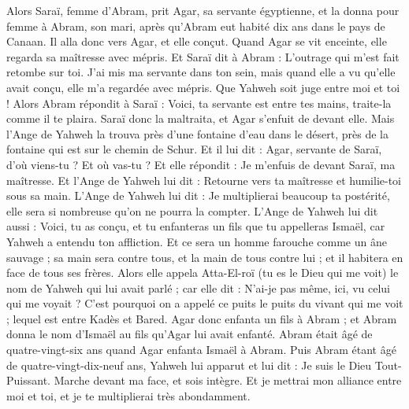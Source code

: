 \begin{multicols}{2}
Alors Saraï, femme d'Abram, prit Agar, sa servante égyptienne, et la donna pour femme à Abram, son mari, après qu'Abram eut habité dix ans dans le pays de Canaan.
Il alla donc vers Agar, et elle conçut. Quand Agar se vit enceinte, elle regarda sa maîtresse avec mépris.
Et Saraï dit à Abram : L'outrage qui m'est fait retombe sur toi. J'ai mis ma servante dans ton sein, mais quand elle a vu qu'elle avait conçu, elle m'a regardée avec mépris. Que Yahweh soit juge entre moi et toi !
Alors Abram répondit à Saraï : Voici, ta servante est entre tes mains, traite-la comme il te plaira. Saraï donc la maltraita, et Agar s'enfuit de devant elle.
Mais l'Ange de Yahweh la trouva près d'une fontaine d'eau dans le désert, près de la fontaine qui est sur le chemin de Schur.
Et il lui dit : Agar, servante de Saraï, d'où viens-tu ? Et où vas-tu ? Et elle répondit : Je m'enfuis de devant Saraï, ma maîtresse.
Et l'Ange de Yahweh lui dit : Retourne vers ta maîtresse et humilie-toi sous sa main.
L'Ange de Yahweh lui dit : Je multiplierai beaucoup ta postérité, elle sera si nombreuse qu'on ne pourra la compter.
L'Ange de Yahweh lui dit aussi : Voici, tu as conçu, et tu enfanteras un fils que tu appelleras Ismaël, car Yahweh a entendu ton affliction.
Et ce sera un homme farouche comme un âne sauvage ; sa main sera contre tous, et la main de tous contre lui ; et il habitera en face de tous ses frères.
Alors elle appela Atta-El-roï (tu es le Dieu qui me voit) le nom de Yahweh qui lui avait parlé ; car elle dit : N'ai-je pas même, ici, vu celui qui me voyait ?
C'est pourquoi on a appelé ce puits le puits du vivant qui me voit ; lequel est entre Kadès et Bared.
Agar donc enfanta un fils à Abram ; et Abram donna le nom d'Ismaël au fils qu'Agar lui avait enfanté.
Abram était âgé de quatre-vingt-six ans quand Agar enfanta Ismaël à Abram.
\VerseOne{}Puis Abram étant âgé de quatre-vingt-dix-neuf ans, Yahweh lui apparut et lui dit : Je suis le Dieu Tout-Puissant. Marche devant ma face, et sois intègre.
Et je mettrai mon alliance entre moi et toi, et je te multiplierai très abondamment.

\end{multicols}
